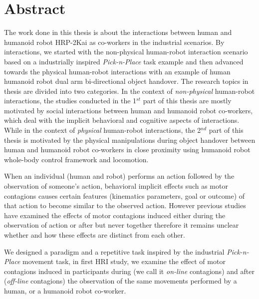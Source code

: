 {\color{blue}\chapter*{Abstract}}
\thispagestyle{empty}



The work done in this thesis is about the interactions between human and humanoid robot HRP-2Kai as co-workers in the industrial scenarios. By interactions, we started with the non-physical human-robot interaction scenario based on a industrially inspired \textit{Pick-n-Place} task example and then advanced towards the physical human-robot interactions with an example of human humanoid robot dual arm bi-directional object handover. The research topics in thesis are divided into two categories. In the context of \textit{non-physical} human-robot interactions, the studies conducted in the 1$^{st}$ part of this thesis are mostly motivated by social interactions between human and humanoid robot co-workers, which deal with the implicit behavioral and cognitive aspects of interactions. While in the context of \textit{physical} human-robot interactions, the 2$^{nd}$ part of this thesis is motivated by the physical manipulations during object handover between human and humanoid robot co-workers in close proximity using humanoid robot whole-body control framework and locomotion.


When an individual (human and robot) performs an action followed by the observation of someone's action, behavioral implicit effects such as motor contagions causes certain features (kinematics parameters, goal or outcome) of that action to become similar to the observed action. However previous studies have examined the effects of motor contagions induced either during the observation of action or after but never together therefore it remains unclear whether and how these effects are distinct from each other.

We designed a paradigm and a repetitive task inspired by the industrial \textit{Pick-n-Place} movement task, in first HRI study, we examine the effect of motor contagions induced in participants during (we call it \textit{on-line} contagions) and after (\textit{off-line} contagions) the observation of the same movements performed by a human, or a humanoid robot co-worker.

